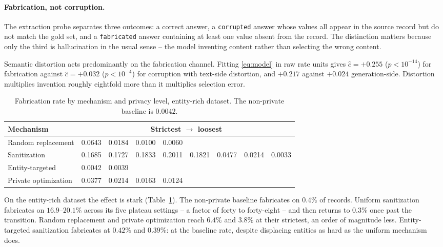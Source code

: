 \paragraph{Fabrication, not corruption.}
The extraction probe separates three outcomes:
a correct answer,
a \texttt{corrupted} answer whose values all appear in the source record but do not match the gold set,
and a \texttt{fabricated} answer containing at least one value absent from the record.
The distinction matters because only the third is hallucination in the usual sense -- the model inventing content rather than selecting the wrong content.

Semantic distortion acts predominantly on the fabrication channel.
Fitting \eqref{eq:model} in raw rate units gives $\hat c = +0.255$ ($p < 10^{-14}$) for fabrication against $\hat c = +0.032$ ($p < 10^{-4}$) for corruption with text-side distortion,
and $+0.217$ against $+0.024$ generation-side.
Distortion multiplies invention roughly eightfold more than it multiplies selection error.

\begin{table}[t]
  \centering
  \caption{Fabrication rate by mechanism and privacy level,
  entity-rich dataset.
  The non-private baseline is $0.0042$.}
  \label{tab:fabrication}
  \footnotesize
  \setlength{\tabcolsep}{3pt}
  \begin{tabular}{lcccccccc}
    \toprule
    Mechanism & \multicolumn{8}{c}{Strictest $\to$ loosest} \\
    \midrule
    Random replacement   & 0.0643 & 0.0184 & 0.0100 & 0.0060 & & & & \\
    Sanitization         & 0.1685 & 0.1727 & 0.1833 & 0.2011 & 0.1821 & 0.0477 & 0.0214 & 0.0033 \\
    Entity-targeted      & 0.0042 & 0.0039 & & & & & & \\
    Private optimization & 0.0377 & 0.0214 & 0.0163 & 0.0124 & & & & \\
    \bottomrule
  \end{tabular}
\end{table}

On the entity-rich dataset the effect is stark (Table~\ref{tab:fabrication}).
The non-private baseline fabricates on $0.4\%$ of records.
Uniform sanitization fabricates on $16.9$--$20.1\%$ across its five plateau settings -- a factor of forty to forty-eight -- and then returns to $0.3\%$ once past the transition.
Random replacement and private optimization reach $6.4\%$ and $3.8\%$ at their strictest,
an order of magnitude less.
Entity-targeted sanitization fabricates at $0.42\%$ and $0.39\%$:
at the baseline rate,
despite displacing entities as hard as the uniform mechanism does.

